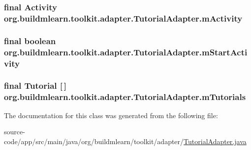 \subsubsection[{\texorpdfstring{m\+Activity}{mActivity}}]{\setlength{\rightskip}{0pt plus 5cm}final Activity org.\+buildmlearn.\+toolkit.\+adapter.\+Tutorial\+Adapter.\+m\+Activity\hspace{0.3cm}{\ttfamily [private]}}\hypertarget{classorg_1_1buildmlearn_1_1toolkit_1_1adapter_1_1TutorialAdapter_a57dfda5d3f4dc443d192f51565ebb2b9}{}\label{classorg_1_1buildmlearn_1_1toolkit_1_1adapter_1_1TutorialAdapter_a57dfda5d3f4dc443d192f51565ebb2b9}
\subsubsection[{\texorpdfstring{m\+Start\+Activity}{mStartActivity}}]{\setlength{\rightskip}{0pt plus 5cm}final boolean org.\+buildmlearn.\+toolkit.\+adapter.\+Tutorial\+Adapter.\+m\+Start\+Activity\hspace{0.3cm}{\ttfamily [private]}}\hypertarget{classorg_1_1buildmlearn_1_1toolkit_1_1adapter_1_1TutorialAdapter_a61fd169c8bbacba2190b0463124eb3e4}{}\label{classorg_1_1buildmlearn_1_1toolkit_1_1adapter_1_1TutorialAdapter_a61fd169c8bbacba2190b0463124eb3e4}
\subsubsection[{\texorpdfstring{m\+Tutorials}{mTutorials}}]{\setlength{\rightskip}{0pt plus 5cm}final {\bf Tutorial} \mbox{[}$\,$\mbox{]} org.\+buildmlearn.\+toolkit.\+adapter.\+Tutorial\+Adapter.\+m\+Tutorials\hspace{0.3cm}{\ttfamily [private]}}\hypertarget{classorg_1_1buildmlearn_1_1toolkit_1_1adapter_1_1TutorialAdapter_a19f6ea2d13708f625a7cebfe6d8b6021}{}\label{classorg_1_1buildmlearn_1_1toolkit_1_1adapter_1_1TutorialAdapter_a19f6ea2d13708f625a7cebfe6d8b6021}


The documentation for this class was generated from the following file\+:\begin{DoxyCompactItemize}
\item 
source-\/code/app/src/main/java/org/buildmlearn/toolkit/adapter/\hyperlink{TutorialAdapter_8java}{Tutorial\+Adapter.\+java}\end{DoxyCompactItemize}
